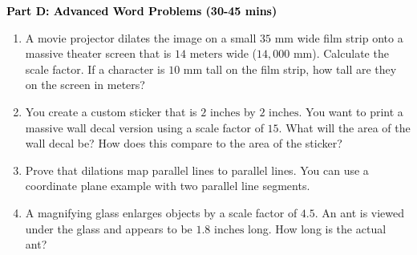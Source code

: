 \documentclass[12pt, letterpaper, fleqn]{article}
\begin{document}
\newpage

\begin{tcolorbox}[colback=customteal!20]
\large\textcolor{black}{\textbf{Part D: Advanced Word Problems (30-45 mins)}}
\end{tcolorbox}

\vspace{3mm}

\begin{enumerate}[itemsep=5.5cm, leftmargin=0.6cm, resume]
\item A movie projector dilates the image on a small $35\text{ mm}$ wide film strip onto a massive theater screen that is $14\text{ meters}$ wide ($14,000\text{ mm}$). Calculate the scale factor. If a character is $10\text{ mm}$ tall on the film strip, how tall are they on the screen in meters?
\item You create a custom sticker that is $2\text{ inches}$ by $2\text{ inches}$. You want to print a massive wall decal version using a scale factor of $15$. What will the area of the wall decal be? How does this compare to the area of the sticker?
\item Prove that dilations map parallel lines to parallel lines. You can use a coordinate plane example with two parallel line segments.
\item A magnifying glass enlarges objects by a scale factor of $4.5$. An ant is viewed under the glass and appears to be $1.8\text{ inches}$ long. How long is the actual ant?
\end{enumerate}
\end{document}
